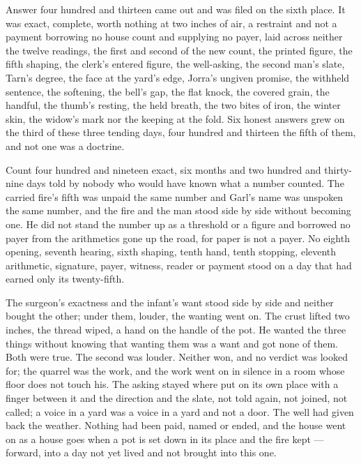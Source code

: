 Answer four hundred and thirteen came out and was filed on the sixth place. It was exact, complete, worth nothing at two inches of air, a restraint and not a payment borrowing no house count and supplying no payer, laid across neither the twelve readings, the first and second of the new count, the printed figure, the fifth shaping, the clerk's entered figure, the well-asking, the second man's slate, Tarn's degree, the face at the yard's edge, Jorra's ungiven promise, the withheld sentence, the softening, the bell's gap, the flat knock, the covered grain, the handful, the thumb's resting, the held breath, the two bites of iron, the winter skin, the widow's mark nor the keeping at the fold. Six honest answers grew on the third of these three tending days, four hundred and thirteen the fifth of them, and not one was a doctrine.

Count four hundred and nineteen exact, six months and two hundred and thirty-nine days told by nobody who would have known what a number counted. The carried fire's fifth was unpaid the same number and Garl's name was unspoken the same number, and the fire and the man stood side by side without becoming one. He did not stand the number up as a threshold or a figure and borrowed no payer from the arithmetics gone up the road, for paper is not a payer. No eighth opening, seventh hearing, sixth shaping, tenth hand, tenth stopping, eleventh arithmetic, signature, payer, witness, reader or payment stood on a day that had earned only its twenty-fifth.

The surgeon's exactness and the infant's want stood side by side and neither bought the other; under them, louder, the wanting went on. The crust lifted two inches, the thread wiped, a hand on the handle of the pot. He wanted the three things without knowing that wanting them was a want and got none of them. Both were true. The second was louder. Neither won, and no verdict was looked for; the quarrel was the work, and the work went on in silence in a room whose floor does not touch his. The asking stayed where put on its own place with a finger between it and the direction and the slate, not told again, not joined, not called; a voice in a yard was a voice in a yard and not a door. The well had given back the weather. Nothing had been paid, named or ended, and the house went on as a house goes when a pot is set down in its place and the fire kept --- forward, into a day not yet lived and not brought into this one.
